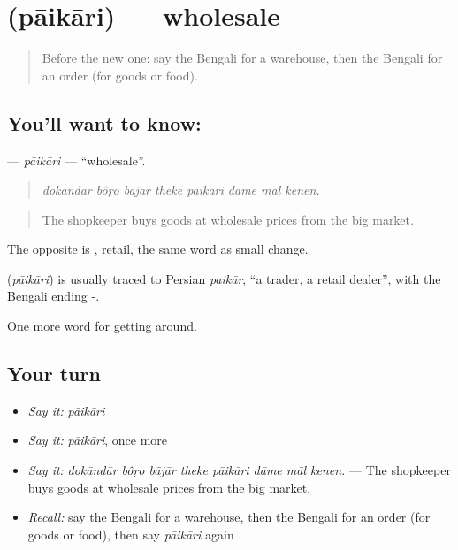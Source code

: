 \section[\texorpdfstring{\bn{পাইকারি} (pāikāri)}{পাইকারি (pāikāri)}]{ (pāikāri) — wholesale}

\label{lesson:BN-C421-paikari}



\begin{quote}
Before the new one: say the Bengali for a warehouse, then the Bengali for an order (for goods or food).
\end{quote}

\subsection*{You'll want to know: }
\textbf{} — \emph{pāikāri} — \textquotedblleft{}wholesale\textquotedblright{}.

\begin{quote}
       
\end{quote}

\begin{quote}
\emph{dokāndār bôṛo bājār theke pāikāri dāme māl kenen.}
\end{quote}

\begin{quote}
The shopkeeper buys goods at wholesale prices from the big market.
\end{quote}

The opposite is , retail, the same word as small change.

\begin{cousinweb}
\textbf{} (\emph{pāikāri}) is usually traced to Persian \emph{paikār}, \textquotedblleft{}a trader, a retail dealer\textquotedblright{}, with the Bengali ending -.
\end{cousinweb}

\begin{grammarlens}[title={What you've built}]
One more word for getting around.
\end{grammarlens}

\subsection*{Your turn}
\begin{itemize}
\raggedright
  \item \emph{Say it:} \emph{pāikāri}
  \item \emph{Say it:} \emph{pāikāri}, once more
  \item \emph{Say it:} \emph{dokāndār bôṛo bājār theke pāikāri dāme māl kenen.} — The shopkeeper buys goods at wholesale prices from the big market.
  \item \emph{Recall:} say the Bengali for a warehouse, then the Bengali for an order (for goods or food), then say \emph{pāikāri} again
\end{itemize}

